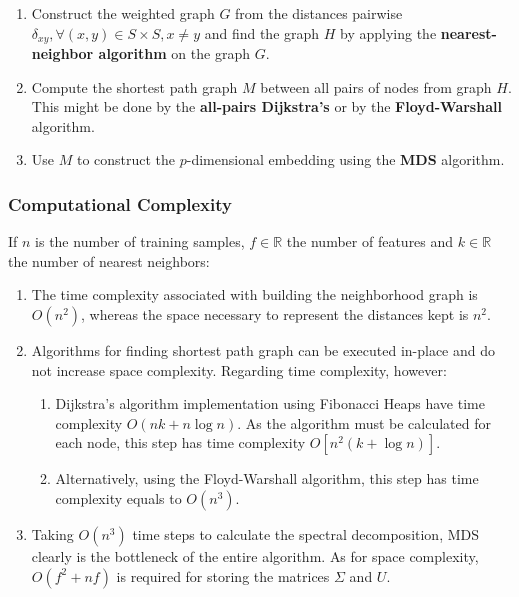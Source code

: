 \documentclass[12pt]{article}
\begin{document}
\begin{enumerate}
	\item Construct the weighted graph $G$ from the distances pairwise $\delta_{xy}, \forall (x, y) \in S \times S, x \ne y$ and find the graph $H$ by applying the \textbf{nearest-neighbor algorithm} on the graph $G$.

	\item Compute the shortest path graph $M$ between all pairs of nodes from graph $H$. This might be done by the \textbf{all-pairs Dijkstra's} or by the \textbf{Floyd-Warshall} algorithm.

	\item Use $M$ to construct the $p$-dimensional embedding using the \textbf{MDS} algorithm.
\end{enumerate}

\subsubsection{Computational Complexity}
\label{sec:isocomplexity}

If $n$ is the number of training samples, $f \in \mathbb{R}$ the number of features and $k \in \mathbb{R}$ the number of nearest neighbors:

\begin{enumerate}
	\item The time complexity associated with building the neighborhood graph is $O(n^2)$, whereas the space necessary to represent the distances kept is $n^2$.
	\item Algorithms for finding shortest path graph can be executed in-place and do not increase space complexity. Regarding time complexity, however:
	\begin{enumerate}
		\item Dijkstra's algorithm implementation using Fibonacci Heaps have time complexity $O(nk + n \log n)$. As the algorithm must be calculated for each node, this step has time complexity $O[n^2(k + \log n)]$.
		\item Alternatively, using the Floyd-Warshall algorithm, this step has time complexity equals to $O(n^3)$.
	\end{enumerate}
	\item Taking $O(n^3)$ time steps to calculate the spectral decomposition, MDS clearly is the bottleneck of the entire algorithm. \cite{cay2005} \cite{silva2002global} As for space complexity, $O(f^2 + nf)$ is required for storing the matrices $\Sigma$ and $U$.
\end{enumerate}
\end{document}
